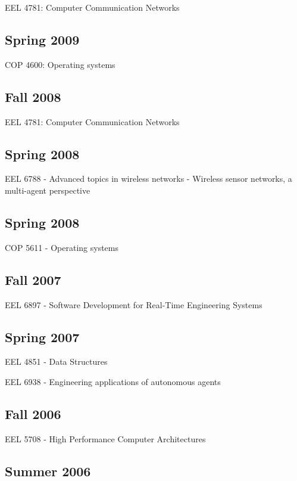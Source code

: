 EEL 4781: Computer Communication Networks

\subsection*{Spring 2009}

COP 4600: Operating systems

\subsection*{Fall 2008}

EEL 4781: Computer Communication Networks

\subsection*{Spring 2008}

EEL 6788 - Advanced topics in wireless networks - Wireless sensor networks, a multi-agent perspective

\subsection*{Spring 2008}

COP 5611 - Operating systems

\subsection*{Fall 2007}

EEL 6897 - Software Development for Real-Time Engineering Systems

\subsection*{Spring 2007}

EEL 4851 - Data Structures

EEL 6938 - Engineering applications of autonomous agents

\subsection*{Fall 2006}

EEL 5708 - High Performance Computer Architectures

\subsection*{Summer 2006}

